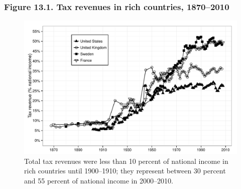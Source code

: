 \documentclass[t]{beamer}\usepackage[]{graphicx}\usepackage[]{color}
\newenvironment{knitrout}{}{} %
\begin{document}
\begin{frame}[label=Figure_13_1]
\frametitle{Figure 13.1. Tax revenues in rich countries, 1870--2010}
\begin{figure}[t]
\begin{minipage}[b]{\textwidth}
\centering
\begin{knitrout}\footnotesize
{}\color{fgcolor}

{\centering \includegraphics[width=1\linewidth]{figures/bw/Figure_13_1} 

}



\end{knitrout}
\caption{Total tax revenues were less than 10 percent of national income in rich countries until 1900--1910; they represent between 30 percent and 55 percent of national income in 2000--2010.}
\end{minipage}
\end{figure}
\end{frame}
\end{document}
